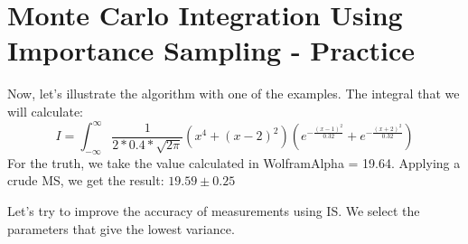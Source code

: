 \documentclass{article}
\begin{document}
\section{Monte Carlo Integration Using Importance Sampling - Practice}
Now, let's illustrate the algorithm with one of the examples.
The integral that we will calculate:
\newline
	\begin{equation}\label{eq:fourierrow}
		I = \int_{-\infty}^{\infty}\frac{1}{2*0.4*\sqrt{2\pi}}(x^4+{(x-2)}^2)(e^{-\frac{{(x-1)}^2}{0.32}}+e^{-\frac{{(x+2)}^2}{0.32}})
	\end{equation}
\newline
For the truth, we take the value calculated in WolframAlpha = 19.64. Applying a crude MS, we get the result: ${19.59 \pm 0.25}$
\newline
\begin{figure}[h!]
\end{figure}
\newline 
Let's try to improve the accuracy of measurements using IS. We select the parameters that give the lowest variance.
\newline
\begin{figure}[h!]
\end{figure}
\end{document}
